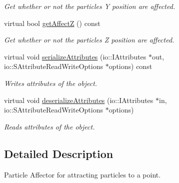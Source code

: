 \begin{DoxyCompactItemize}
\begin{DoxyCompactList}\small\item\em Get whether or not the particles Y position are affected. \end{DoxyCompactList}\item 
\hypertarget{classirr_1_1scene_1_1_c_particle_attraction_affector_a929295db7bfbb9cff3aea9a02c39126c}{virtual bool \hyperlink{classirr_1_1scene_1_1_c_particle_attraction_affector_a929295db7bfbb9cff3aea9a02c39126c}{get\-Affect\-Z} () const }\label{classirr_1_1scene_1_1_c_particle_attraction_affector_a929295db7bfbb9cff3aea9a02c39126c}

\begin{DoxyCompactList}\small\item\em Get whether or not the particles Z position are affected. \end{DoxyCompactList}\item 
\hypertarget{classirr_1_1scene_1_1_c_particle_attraction_affector_a9b2c2f1e51bf94747e40a7608fe284f9}{virtual void \hyperlink{classirr_1_1scene_1_1_c_particle_attraction_affector_a9b2c2f1e51bf94747e40a7608fe284f9}{serialize\-Attributes} (io\-::\-I\-Attributes $\ast$out, io\-::\-S\-Attribute\-Read\-Write\-Options $\ast$options) const }\label{classirr_1_1scene_1_1_c_particle_attraction_affector_a9b2c2f1e51bf94747e40a7608fe284f9}

\begin{DoxyCompactList}\small\item\em Writes attributes of the object. \end{DoxyCompactList}\item 
\hypertarget{classirr_1_1scene_1_1_c_particle_attraction_affector_a8fd91072879c0e7ab1196ffc2dcba78c}{virtual void \hyperlink{classirr_1_1scene_1_1_c_particle_attraction_affector_a8fd91072879c0e7ab1196ffc2dcba78c}{deserialize\-Attributes} (io\-::\-I\-Attributes $\ast$in, io\-::\-S\-Attribute\-Read\-Write\-Options $\ast$options)}\label{classirr_1_1scene_1_1_c_particle_attraction_affector_a8fd91072879c0e7ab1196ffc2dcba78c}

\begin{DoxyCompactList}\small\item\em Reads attributes of the object. \end{DoxyCompactList}\end{DoxyCompactItemize}


\subsection{Detailed Description}
Particle Affector for attracting particles to a point. 

